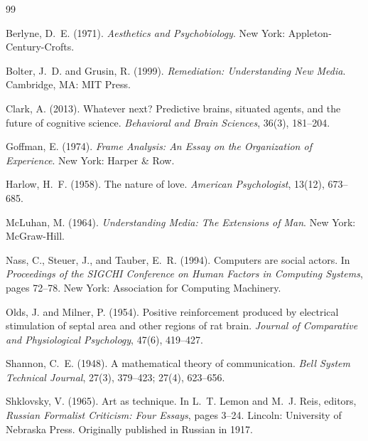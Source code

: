 \documentclass[11pt]{article}
\begin{document}
\begin{thebibliography}{99}

Berlyne, D.~E. (1971).
\newblock \emph{Aesthetics and Psychobiology}.
\newblock New York: Appleton-Century-Crofts.

Bolter, J.~D. and Grusin, R. (1999).
\newblock \emph{Remediation: Understanding New Media}.
\newblock Cambridge, MA: MIT Press.

Clark, A. (2013).
\newblock Whatever next? Predictive brains, situated agents, and the future
  of cognitive science.
\newblock \emph{Behavioral and Brain Sciences}, 36(3), 181--204.

Goffman, E. (1974).
\newblock \emph{Frame Analysis: An Essay on the Organization of Experience}.
\newblock New York: Harper \& Row.

Harlow, H.~F. (1958).
\newblock The nature of love.
\newblock \emph{American Psychologist}, 13(12), 673--685.

McLuhan, M. (1964).
\newblock \emph{Understanding Media: The Extensions of Man}.
\newblock New York: McGraw-Hill.

Nass, C., Steuer, J., and Tauber, E.~R. (1994).
\newblock Computers are social actors.
\newblock In \emph{Proceedings of the SIGCHI Conference on Human Factors in
  Computing Systems}, pages 72--78.
\newblock New York: Association for Computing Machinery.

Olds, J. and Milner, P. (1954).
\newblock Positive reinforcement produced by electrical stimulation of septal
  area and other regions of rat brain.
\newblock \emph{Journal of Comparative and Physiological Psychology},
  47(6), 419--427.

Shannon, C.~E. (1948).
\newblock A mathematical theory of communication.
\newblock \emph{Bell System Technical Journal}, 27(3), 379--423;
  27(4), 623--656.

Shklovsky, V. (1965).
\newblock Art as technique.
\newblock In L.~T. Lemon and M.~J. Reis, editors,
  \emph{Russian Formalist Criticism: Four Essays}, pages 3--24.
\newblock Lincoln: University of Nebraska Press.
\newblock Originally published in Russian in 1917.


\end{thebibliography}
\end{document}
